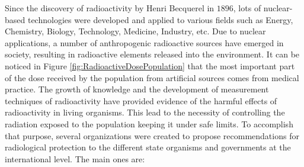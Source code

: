 Since the discovery of radioactivity by Henri Becquerel in $1896$, lots of nuclear-based technologies were developed and applied to various fields such as Energy, Chemistry, Biology, Technology, Medicine, Industry, etc. Due to nuclear applications, a number of anthropogenic radioactive sources have emerged in society, resulting in radioactive elements released into the environment. It can be noticed in Figure \ref{fig:RadioactiveDosePopulation} that the most important part of the dose received by the population from artificial sources comes from medical practice. The growth of knowledge and the development of measurement techniques of radioactivity have provided evidence of the harmful effects of radioactivity in living organisms. This lead to the necessity of controlling the radiation exposed to the population  keeping it under safe limits. To accomplish that purpose, several organizations were created to propose recommendations for radiological protection to the different state organisms and governments at the international level. The main ones are:


